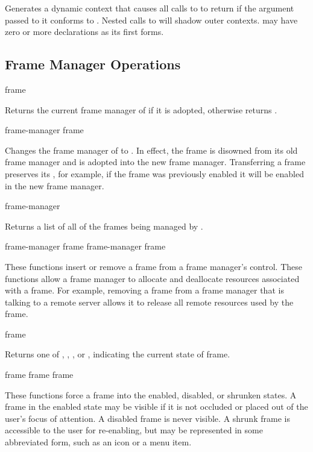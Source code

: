Generates a dynamic context that causes all calls to  to
return  if the  argument passed to it conforms to
.  Nested calls to  will shadow outer
contexts.   may have zero or more declarations as its first forms.


\subsection {Frame Manager Operations}

 {frame} 

Returns the current frame manager of  if it is adopted, otherwise
returns .

 {frame-manager frame}

Changes the frame manager of  to .  In effect, the
frame is disowned from its old frame manager and is adopted into the new frame
manager.  Transferring a frame preserves its , for example, if
the frame was previously enabled it will be enabled in the new frame manager.

 {frame-manager} 

Returns a list of all of the frames being managed by .
\ReadOnly

 {frame-manager frame}
 {frame-manager frame} 

These functions insert or remove a frame from a frame manager's control.  These
functions allow a frame manager to allocate and deallocate resources associated
with a frame.  For example, removing a frame from a frame manager that is
talking to a remote server allows it to release all remote resources used by the
frame.


 {frame}

Returns one of , , , or ,
indicating the current state of frame.

 {frame}
 {frame}
 {frame}

These functions force a frame into the enabled, disabled, or shrunken states.  A
frame in the enabled state may be visible if it is not occluded or placed out of
the user's focus of attention.  A disabled frame is never visible.  A shrunk
frame is accessible to the user for re-enabling, but may be represented in some
abbreviated form, such as an icon or a menu item.


